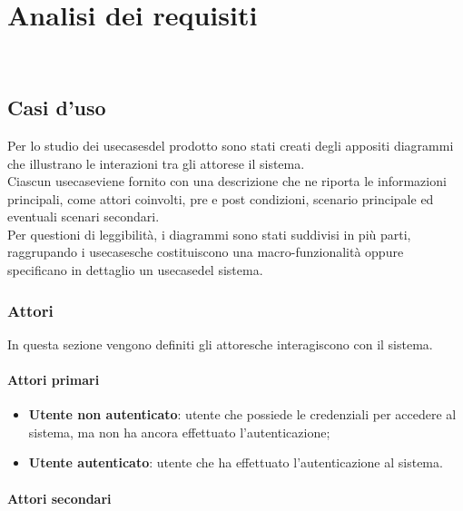 \chapter{Analisi dei requisiti}
\label{cap:analisi-requisiti}

\\

\section{Casi d'uso}
\label{sec:usecase}

Per lo studio dei \glspl{usecase}\glsoccur del prodotto sono stati creati degli appositi diagrammi che illustrano le interazioni tra gli \glspl{attore}\glsoccur e il sistema.\\
Ciascun \gls{usecase}\glsoccur viene fornito con una descrizione che ne riporta le informazioni principali, come attori coinvolti, pre e post condizioni, scenario principale ed eventuali scenari secondari.\\
Per questioni di leggibilità, i diagrammi sono stati suddivisi in più parti, raggrupando i \glspl{usecase}\glsoccur che costituiscono una macro-funzionalità oppure specificano in dettaglio un \gls{usecase}\glsoccur del sistema.

\subsection{Attori}
\label{subsec:attori}

In questa sezione vengono definiti gli \glspl{attore}\glsoccur che interagiscono con il sistema.

\subsubsection{Attori primari}
\label{subsubsec:attori-primari}

\begin{itemize}
    \item \textbf{Utente non autenticato}: utente che possiede le credenziali per accedere al sistema, ma non ha ancora effettuato l'autenticazione;
    \item \textbf{Utente autenticato}: utente che ha effettuato l'autenticazione al sistema.
\end{itemize}

\subsubsection{Attori secondari}
\label{subsubsec:attori-secondari}

